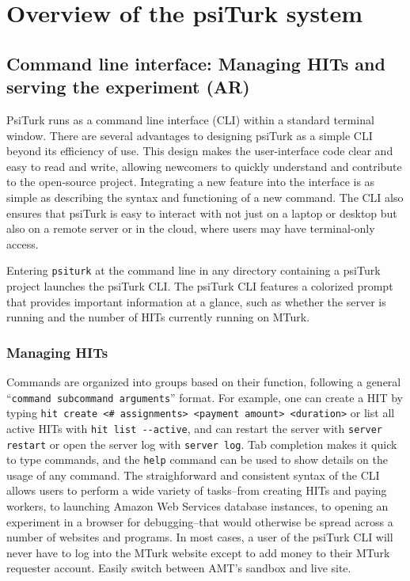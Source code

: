\documentclass[jou,apacite]{apa6}
\begin{document}
\section{Overview of the psiTurk system}


\subsection{Command line interface: Managing HITs and serving the experiment (AR)}

PsiTurk runs as a command line interface (CLI) within a standard terminal window.
There are several advantages to designing psiTurk as a simple CLI beyond its efficiency of use. This
design makes the user-interface code clear and easy to read and write, allowing newcomers to quickly
understand and contribute to the open-source project. Integrating a new feature into the interface
is as simple as describing the syntax and functioning of a new command. The CLI also ensures that
psiTurk is easy to interact with not just on a laptop or desktop but also on a remote server or in
the cloud, where users may have terminal-only access.
 
Entering
\texttt{psiturk} at the command line in any directory containing a psiTurk project launches the
psiTurk CLI.
The psiTurk CLI features a colorized prompt that provides important information at a glance, such as
whether the server is running and the number of HITs currently running on MTurk. 

\subsubsection{Managing HITs}
Commands are
organized into groups based on their function, following a general ``\texttt{command subcommand
arguments}'' format. For example, one can create a HIT by typing \texttt{hit create <\# assignments>
<payment amount> <duration>} or list all active HITs with \texttt{hit list -{}-active}, and can
restart the server with \texttt{server restart} or open the server log with \texttt{server log}. Tab
completion makes it quick to type commands, and the \texttt{help} command can be used to show
details on the usage of any command. The straighforward and consistent syntax of the CLI allows
users to perform a wide variety of tasks--from creating HITs and paying workers, to launching Amazon
Web Services database instances, to opening an experiment in a browser for debugging--that
would otherwise be spread across a number of websites and programs. In most cases, a user of the
psiTurk CLI will never have to log into the MTurk website except to add money to their MTurk
requester account.
Easily switch between AMT's sandbox and live site.
\end{document}
